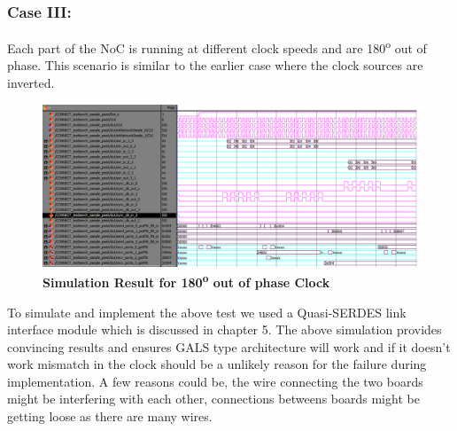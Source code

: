 \subsubsection{Case III:} Each part of the NoC is running at different clock speeds and are 180\textsuperscript{o} out of phase. This scenario is similar to the earlier case where the clock sources are inverted.  
\begin{figure}[H]
  \centering
   \includegraphics[scale=0.5]{./figs/OutofPhaseTest}
  \caption{\textbf{Simulation Result for 180\textsuperscript{o} out of phase Clock}}
  \label{OutofPhaseTest}
\end{figure}

To simulate and implement the above test we used a Quasi-SERDES link interface module which is discussed in chapter 5. The above simulation provides convincing results and ensures GALS type architecture will work and if it doesn't work mismatch in the clock should be a unlikely reason for the failure during implementation. A few reasons could be, the wire connecting the two boards might be interfering with each other, connections betweens boards might be getting loose as there are many wires.